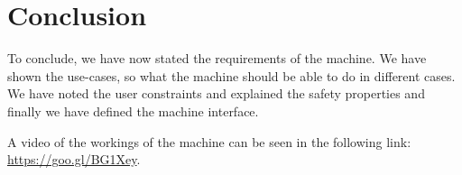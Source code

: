 \section{Conclusion}
To conclude, we have now stated the requirements of the machine. We have shown the use-cases, so what the machine should be able to do in different cases. We have noted the user constraints and explained the safety properties and finally we have defined the machine interface.

A video of the workings of the machine can be seen in the following link: \href{https://goo.gl/BG1Xey}{https://goo.gl/BG1Xey}.

